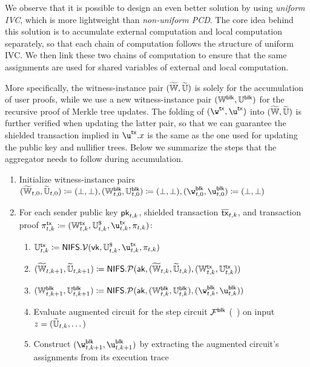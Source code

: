 We observe that it is possible to design an even better solution by using \textit{uniform \ac{IVC}}, which is more lightweight than \textit{non-uniform \ac{PCD}}.
The core idea behind this solution is to accumulate external computation and local computation separately, so that each chain of computation follows the structure of uniform \ac{IVC}.
We then link these two chains of computation to ensure that the same assignments are used for shared variables of external and local computation.

More specifically, the witness-instance pair $(\widetilde{{\mathbb{W}}}, \widetilde{{\mathbb{U}}})$ is solely for the accumulation of user proofs, while we use a new witness-instance pair $({\mathbb{W}}^\mathsf{blk}, {\mathbb{U}}^\mathsf{blk})$ for the recursive proof of Merkle tree updates.
The folding of $(\w^\Tx, \u^\Tx)$ into $(\widetilde{{\mathbb{W}}}, \widetilde{{\mathbb{U}}})$ is further verified when updating the latter pair, so that we can guarantee the shielded transaction implied in $\u^\Tx.x$ is the same as the one used for updating the public key and nullifier trees.
Below we summarize the steps that the aggregator needs to follow during accumulation.
\begin{enumerate}
    \item Initialize witness-instance pairs $(\widetilde{\W}_{t, 0}, \widetilde{\U}_{t, 0}) \coloneqq (\bot, \bot), (\W^\Block_{t, 0}, \U^\Block_{t, 0}) \coloneqq (\bot, \bot), (\w^\Block_{t, 0}, \u^\Block_{t, 0}) \coloneqq (\bot, \bot)$
    \item For each sender public key ${\mathsf{pk}}_{t, k}$, shielded transaction $\overline{\mathsf{tx}}_{t, k}$, and transaction proof $\pi^\Tx_{t, k} \coloneqq (\W^\Tx_{t, k}, \U^\$_{t, k}, \u^\Tx_{t, k}, \pi_{t, k})$:
    \begin{enumerate}
        \item $\U^\Tx_{t, k} \coloneqq \NIFSVerify(\Vk, \U^\$_{t, k}, \u^\Tx_{t, k}, \pi_{t, k})$
        \item $(\widetilde{{\mathbb{W}}}_{t, k + 1}, \widetilde{{\mathbb{U}}}_{t, k + 1}) \coloneqq \mathsf{\mathsf{NIFS}.\mathcal{P}}({\mathsf{ak}}, (\widetilde{{\mathbb{W}}}_{t, k}, \widetilde{{\mathbb{U}}}_{t, k}), ({\mathbb{W}}^\mathsf{tx}_{t, k}, {\mathbb{U}}^\mathsf{tx}_{t, k}))$
        \item $(\W^\Block_{t, k + 1}, \U^\Block_{t, k + 1}) \coloneqq \NIFSProve(\Ak, (\W^\Block_{t, k}, \U^\Block_{t, k}), (\w^\Block_{t, k}, \u^\Block_{t, k}))$
        \item Evaluate augmented circuit for the step circuit $\mathcal{F}^\mathsf{blk}$ (~) on input $z = (\widetilde{{\mathbb{U}}}_{t, k}, \dots)$
        \item Construct $(\w^\Block_{t, k + 1}, \u^\Block_{t, k + 1})$ by extracting the augmented circuit's assignments from its execution trace
    \end{enumerate}
\end{enumerate}

